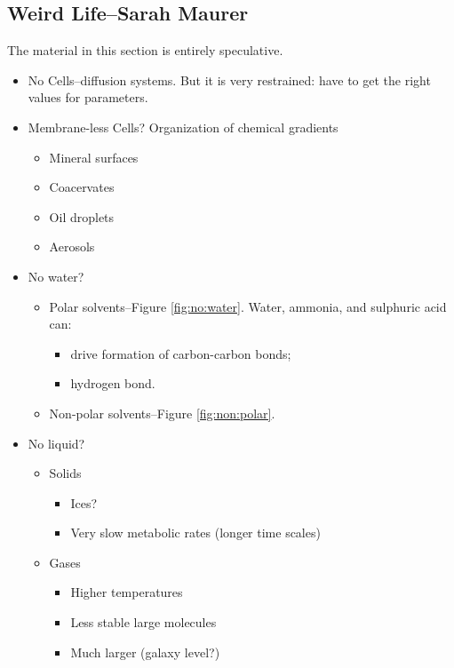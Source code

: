 \documentclass[]{article}
\begin{document}
\subsection[Weird Life]{Weird Life--Sarah Maurer}

The material in this section is entirely speculative.

\begin{itemize}
	\item No Cells--diffusion systems. But it is very restrained: have to get the right values for parameters.
	\item Membrane-less Cells? Organization of 	chemical gradients\cite{hollants2011life}\cite{kim2001life}
	\begin{itemize}
		\item Mineral surfaces
		\item Coacervates
		\item Oil droplets
		\item Aerosols
	\end{itemize}
	\item No water? 
	\begin{itemize}
		\item Polar solvents\cite[Chapter 6]{board2007limits}--Figure \ref{fig:no:water}. Water, ammonia, and sulphuric acid can:
		\begin{itemize}
			\item drive formation of carbon-carbon bonds;
			\item hydrogen bond.
		\end{itemize}
		\item Non-polar solvents\cite{cejkova2014dynamics}--Figure \ref{fig:non:polar}.
	\end{itemize}
	\item No liquid?\cite[Chapter 6]{board2007limits}
	\begin{itemize}
		\item Solids
		\begin{itemize}
			\item Ices?
			\item Very slow metabolic rates (longer time scales)
		\end{itemize}
		\item Gases
		\begin{itemize}
			\item Higher temperatures
			\item Less stable large molecules
			\item Much larger (galaxy level?)
		\end{itemize}
	\end{itemize}
\end{itemize}
\end{document}
